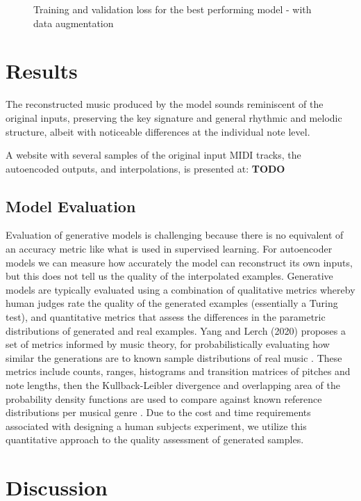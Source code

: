 \documentclass[sigconf,authorversion]{acmart}
\begin{document}
\begin{figure}[htbp]
    \begin{center}
        \scalebox{0.5}{}
    \end{center}
    \caption{Training and validation loss for the best performing model - with data augmentation}
    \label{loss_augment}
\end{figure}


\section{Results}

The reconstructed music produced by the model sounds reminiscent of
the original inputs, preserving the key signature and general rhythmic
and melodic structure, albeit with noticeable differences at the
individual note level.

A website with several samples of the original input MIDI tracks, the
autoencoded outputs, and interpolations, is presented at: \textbf{TODO}

\subsection{Model Evaluation}

Evaluation of generative models is challenging because there is no
equivalent of an accuracy metric like what is used in supervised
learning. For autoencoder models we can measure how accurately the
model can reconstruct its own inputs, but this does not tell us the
quality of the interpolated examples. Generative models are typically
evaluated using a combination of qualitative metrics whereby human
judges rate the quality of the generated examples (essentially a
Turing test), and quantitative metrics that assess the differences in
the parametric distributions of generated and real examples. Yang and
Lerch (2020) proposes a set of metrics informed by music theory, for
probabilistically evaluating how similar the generations are to known
sample distributions of real music \cite{yang_evaluation_2020}. These
metrics include counts, ranges, histograms and transition matrices of
pitches and note lengths, then the Kullback-Leibler divergence and
overlapping area of the probability density functions are used to
compare against known reference distributions per musical genre
\cite{yang_evaluation_2020}. Due to the cost and time requirements
associated with designing a human subjects experiment, we
utilize this quantitative approach to the quality assessment of
generated samples.

\section{Discussion}



\end{document}
